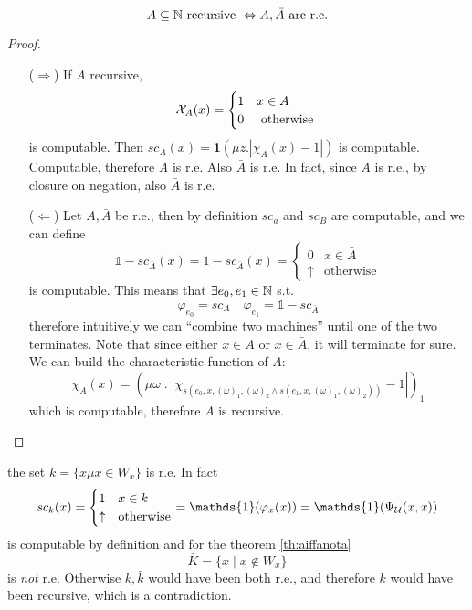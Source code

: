 \begin{theorem}\label{th:aiffanota}
  \[A \subseteq \mathbb{N} \mbox{ recursive } \Leftrightarrow A, \bar{A} \mbox{
      are r.e.} \]
  \begin{proof}
    \begin{itemize}
    \item[($\Rightarrow$)]
      If $A$ recursive,
      \begin{equation*}
        \mathcal{X}_A(x)= \begin{cases}
          1 & x\in A \\
          0 & $ otherwise $
        \end{cases}
      \end{equation*}
      is computable.
      Then $ sc_A(x) = \mathbf{1}(\mu z. | \chi_A(x)- 1 | )$
      is computable. Computable, therefore \textit{A} is r.e. Also
      $\bar{A}$ is r.e. In fact, since $A$ is r.e., by closure on
      negation, also $\bar{A}$ is r.e.

    \item[($\Leftarrow$)] Let $A, \bar{A}$ be r.e., then by definition
      $sc_a$ and $sc_B$ are computable, and we can define
      \[
        \mathds{1} - sc_{\bar{A}}(x) = 1 - sc_{\bar{A}}(x) = \begin{cases}
          0 & x \in \bar{A} \\
          \uparrow & \mbox{otherwise}
        \end{cases}
      \]
      is computable. This means that $\exists e_0, e_1 \in \mathbb{N}$ s.t.
      \[
        \varphi_{e_0} = sc_A \quad \varphi_{e_1} = \mathds{1} -
        sc_{\bar{A}}
      \]
      therefore intuitively we can ``combine two machines'' until one
      of the two terminates. Note that since either $x \in A$ or $x \in \bar{A}$,
      it will terminate for sure. We can build the characteristic function of $A$:
      \[
          \chi_A(x) = (\mu \omega \; . \; |\chi_{s(e_0, x,
            (\omega)_1, (\omega)_2 \wedge s(e_1, x, (\omega)_1,
            (\omega)_2))}-1|)_1
        \]
        which is computable, therefore $A$ is recursive.
    \end{itemize}
  \end{proof}
\end{theorem}

\begin{observation}
  the set $k = \{x \mu x \in W_x\}$ is r.e. In fact
  \[
    sc_k(x) = \begin{cases}
      1 & x \in k \\
      \uparrow & \mbox{otherwise}
    \end{cases}
    = \mathds{1}(\varphi_x(x)) = \mathds{1}(\univ(x,x))
  \]
  is computable by definition and for the theorem \ref{th:aiffanota}
  \[
    \bar{K} = \{x \mid x \notin W_x\}
  \]
  is \emph{not} r.e. Otherwise $k,\bar{k}$ would have been both r.e.,
  and therefore $k$ would have been recursive, which is a
  contradiction.
\end{observation}

